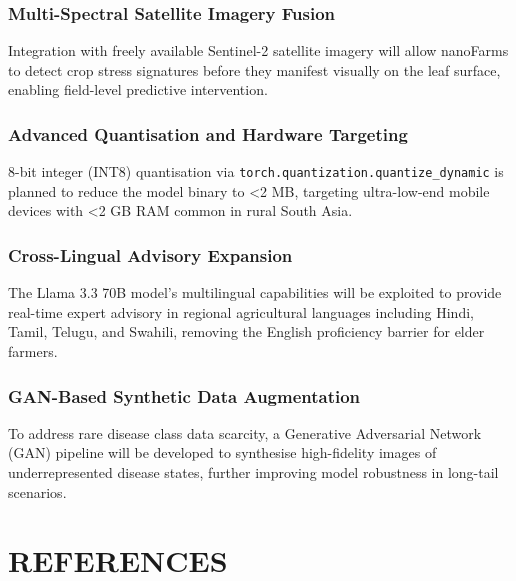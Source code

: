 \documentclass[12pt,oneside]{report}
\begin{document}
\subsection{Multi-Spectral Satellite Imagery Fusion}
Integration with freely available Sentinel-2 satellite imagery will allow nanoFarms to detect crop stress signatures before they manifest visually on the leaf surface, enabling field-level predictive intervention.

\subsection{Advanced Quantisation and Hardware Targeting}
8-bit integer (INT8) quantisation via \texttt{torch.quantization.quantize\_dynamic} is planned to reduce the model binary to <2 MB, targeting ultra-low-end mobile devices with <2 GB RAM common in rural South Asia.

\subsection{Cross-Lingual Advisory Expansion}
The Llama 3.3 70B model's multilingual capabilities will be exploited to provide real-time expert advisory in regional agricultural languages including Hindi, Tamil, Telugu, and Swahili, removing the English proficiency barrier for elder farmers.

\subsection{GAN-Based Synthetic Data Augmentation}
To address rare disease class data scarcity, a Generative Adversarial Network (GAN) pipeline will be developed to synthesise high-fidelity images of underrepresented disease states, further improving model robustness in long-tail scenarios.

\chapter*{REFERENCES}
\fontsize{12}{15}\selectfont
{}
\end{document}

